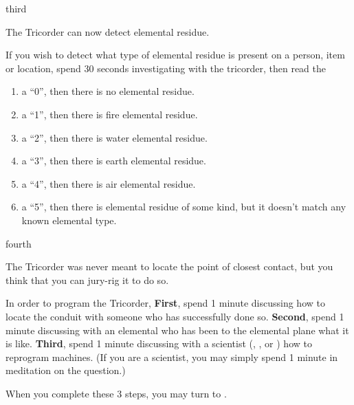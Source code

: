 \documentclass[notebook]{elementals}
\begin{document}
\begin{page}{third}

The Tricorder can now detect elemental residue.

If you wish to detect what type of elemental residue is present on a person, item or location, spend 30 seconds investigating with the tricorder, then read the %

\begin{enumerate}
  \item a ``0'', then there is no elemental residue.
  \item a ``1'', then there is fire elemental residue.
  \item a ``2'', then there is water elemental residue.
  \item a ``3'', then there is earth elemental residue.
  \item a ``4'', then there is air elemental residue.
  \item a ``5'', then there is elemental residue of some kind, but it doesn't match any known elemental type.
\end{enumerate}

\end{page}

\begin{page}{fourth}

The Tricorder was never meant to locate the point of closest contact, but you think that you can jury-rig it to do so.

In order to program the Tricorder, {\bf First}, spend 1 minute discussing how to locate the conduit with someone who has successfully done so. {\bf Second}, spend 1 minute discussing with an elemental who has been to the elemental plane what it is like. {\bf Third}, spend 1 minute discussing with a scientist (\cGD{}, \cScientist{}, or \cMS{}) how to reprogram machines. (If you are a scientist, you may simply spend 1 minute in meditation on the question.)

When you complete these 3 steps, you may turn to .

\end{page}
\end{document}

